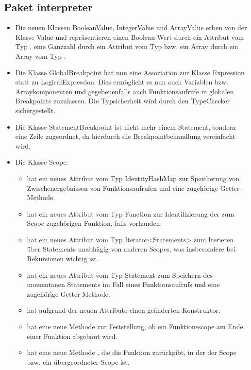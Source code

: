 \subsection{Paket interpreter}
\begin{itemize}
  \item Die neuen Klassen BooleanValue, IntegerValue und ArrayValue erben von der Klasse Value und repr\"{a}sentieren einen Boolean-Wert durch ein Attribut vom Typ , eine Ganzzahl durch ein Attribut vom Typ  bzw. ein Array durch ein Array vom Typ .
  \item Die Klasse GlobalBreakpoint hat nun eine Assoziation zur Klasse Expression statt zu LogicalExpression. Dies erm\"{o}glicht es nun auch Variablen bzw. Arraykomponenten und gegebenenfalls auch Funktionsaufrufe in globalen Breakpoints zuzulassen. Die Typsicherheit wird durch den TypeChecker sichergestellt.
  \item Die Klasse StatementBreakpoint ist nicht mehr einem Statement, sondern eine Zeile zugeordnet, da hierdurch die Breakpointbehandlung vereinfacht wird.
  \item Die Klasse Scope:
  \begin{itemize}
    \item hat ein neues Attribut  vom Typ IdentityHashMap zur Speicherung von Zwischenergebnissen von Funktionsaufrufen und eine zugeh\"{o}rige Getter-Methode.
    \item hat ein neues Attribut  vom Typ Function zur Identifizierung der zum Scope zugeh\"{o}rigen Funktion, falls vorhanden.
    \item hat ein neues Attribut  vom Typ Iterator<Statements> zum Iterieren \"{u}ber Statements unabh\"{a}gig von anderen Scopes, was insbesondere bei Rekursionen wichtig ist.
    \item hat ein neues Attribut  vom Typ Statement zum Speichern des momentanen Statements im Fall eines Funktionsaufrufs und eine zugeh\"{o}rige Getter-Methode.
    \item hat aufgrund der neuen Attribute einen ge\"{a}nderten Konstruktor.
    \item hat eine neue Methode  zur Feststellung, ob ein Funktionsscope am Ende einer Funktion abgebaut wird.
    \item hat eine neue Methode , die die Funktion zur\"{u}ckgibt, in der der Scope bzw. ein \"{u}bergeordneter Scope ist.

\end{itemize}
\end{itemize}
